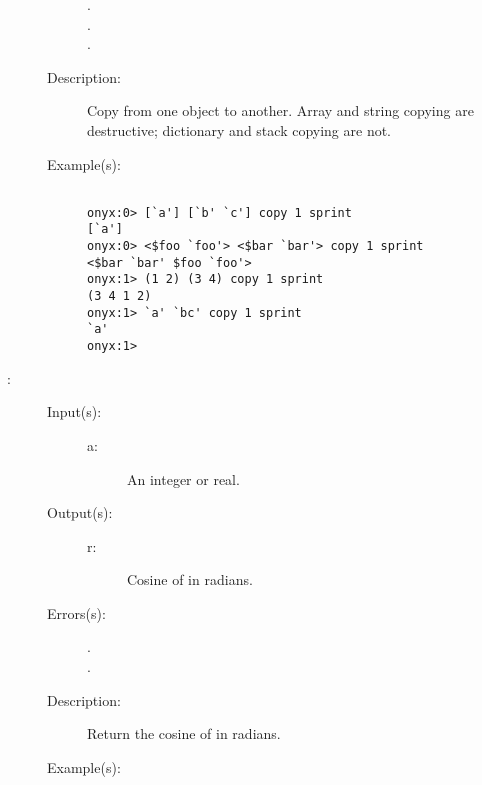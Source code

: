 \begin{description}
\begin{description}
\begin{description}
		\item[.]
		\item[.]
		\item[.]
		\end{description}
	\item[Description: ]
		Copy from one object to another.  Array and string copying are
		destructive; dictionary and stack copying are not.
	\item[Example(s): ]\begin{verbatim}

onyx:0> [`a'] [`b' `c'] copy 1 sprint
[`a']
onyx:0> <$foo `foo'> <$bar `bar'> copy 1 sprint
<$bar `bar' $foo `foo'>
onyx:1> (1 2) (3 4) copy 1 sprint
(3 4 1 2)
onyx:1> `a' `bc' copy 1 sprint
`a'
onyx:1>
		\end{verbatim}
	\end{description}
\label{systemdict:cos}
\item[{\onyxop{a}{cos}{r}}: ]
	\begin{description}\item[]
	\item[Input(s): ]
		\begin{description}\item[]
		\item[a: ]
			An integer or real.
		\end{description}
	\item[Output(s): ]
		\begin{description}\item[]
		\item[r: ]
			Cosine of  in radians.
		\end{description}
	\item[Errors(s): ]
		\begin{description}\item[]
		\item[.]
		\item[.]
		\end{description}
	\item[Description: ]
		Return the cosine of  in radians.
	\item[Example(s): ]\begin{verbatim}


\end{verbatim}
\end{description}
\end{description}
